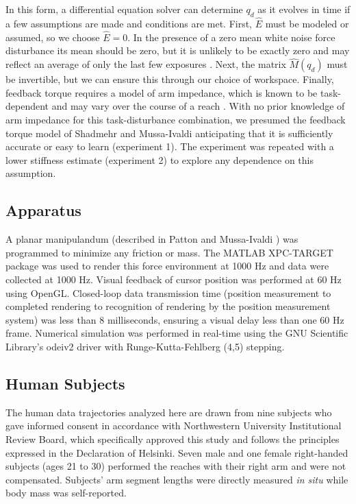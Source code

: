 \documentclass{frontiersSCNS} %
\begin{document}
\begin{methods}
In this form, a differential equation solver can determine $q_d$ as it evolves in time if a few assumptions are made and conditions are met. First, $\hat{E}$ must be modeled or assumed, so we choose $\hat{E}=0$. In the presence of a zero mean white noise force disturbance its mean should be zero, but it is unlikely to be exactly zero and may reflect an average of only the last few exposures \citep{scheidt2001learning}. Next, the matrix $\hat{M}(q_d)$ must be invertible, but we can ensure this through our choice of workspace. Finally, feedback torque requires a model of arm impedance, which is known to be task-dependent \citep{gomi1998task} and may vary over the course of a reach \citep{niu2010temporal}. With no prior knowledge of arm impedance for this task-disturbance combination, we presumed the feedback torque model of Shadmehr and Mussa-Ivaldi anticipating that it is sufficiently accurate or easy to learn (experiment 1). The experiment was repeated with a lower stiffness estimate (experiment 2) to explore any dependence on this assumption.

\subsection{Apparatus}
A planar manipulandum (described in Patton and Mussa-Ivaldi \cite{patton2004robot}) was programmed to minimize any friction or mass. The MATLAB XPC-TARGET package \citep{MATLAB:2008} was used to render this force environment at 1000 Hz and data were collected at 1000 Hz.  Visual feedback of cursor position was performed at 60 Hz using OpenGL. Closed-loop data transmission time (position measurement to completed rendering to recognition of rendering by the position measurement system) was less than 8 milliseconds, ensuring a visual delay less than one 60 Hz frame. Numerical simulation was performed in real-time using the GNU Scientific Library's odeiv2 driver with Runge-Kutta-Fehlberg (4,5) stepping\cite{gough2009gnu}.

\subsection{Human Subjects}
The human data trajectories analyzed here are drawn from nine subjects who gave informed consent in accordance with Northwestern University Institutional Review Board, which specifically approved this study and follows the principles expressed in the Declaration of Helsinki. Seven male and one female right-handed subjects (ages 21 to 30) performed the reaches with their right arm and were not compensated. Subjects' arm segment lengths were directly measured \textit{in situ} while body mass was self-reported.


\end{methods}
\end{document}
